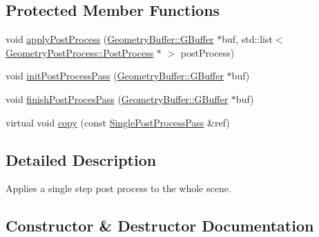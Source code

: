 \subsection*{Protected Member Functions}
\begin{DoxyCompactItemize}
\item 
void \mbox{\hyperlink{class_geometry_engine_1_1_geometry_render_step_1_1_single_post_process_pass_a79ebdd8ab62f0872988993694d9522e4}{apply\+Post\+Process}} (\mbox{\hyperlink{class_geometry_engine_1_1_geometry_buffer_1_1_g_buffer}{Geometry\+Buffer\+::\+G\+Buffer}} $\ast$buf, std\+::list$<$ \mbox{\hyperlink{class_geometry_engine_1_1_geometry_post_process_1_1_post_process}{Geometry\+Post\+Process\+::\+Post\+Process}} $\ast$ $>$ post\+Process)
\item 
void \mbox{\hyperlink{class_geometry_engine_1_1_geometry_render_step_1_1_single_post_process_pass_afb298edabcc05c78af2057da15476f78}{init\+Post\+Process\+Pass}} (\mbox{\hyperlink{class_geometry_engine_1_1_geometry_buffer_1_1_g_buffer}{Geometry\+Buffer\+::\+G\+Buffer}} $\ast$buf)
\item 
void \mbox{\hyperlink{class_geometry_engine_1_1_geometry_render_step_1_1_single_post_process_pass_acc435e016a5e45decba630f5965b2408}{finish\+Post\+Proces\+Pass}} (\mbox{\hyperlink{class_geometry_engine_1_1_geometry_buffer_1_1_g_buffer}{Geometry\+Buffer\+::\+G\+Buffer}} $\ast$buf)
\item 
virtual void \mbox{\hyperlink{class_geometry_engine_1_1_geometry_render_step_1_1_single_post_process_pass_a9b73ca0ef1ca7af5e8187ab24078b0cd}{copy}} (const \mbox{\hyperlink{class_geometry_engine_1_1_geometry_render_step_1_1_single_post_process_pass}{Single\+Post\+Process\+Pass}} \&ref)
\end{DoxyCompactItemize}


\subsection{Detailed Description}
Applies a single step post process to the whole scene. 

\subsection{Constructor \& Destructor Documentation}
\mbox{\label{class_geometry_engine_1_1_geometry_render_step_1_1_single_post_process_pass_a14c18577923851d3d839ddd57832a326}} 
